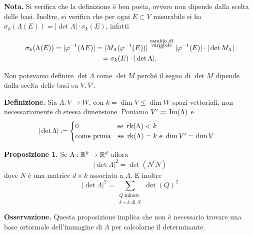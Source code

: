 \textbf{Nota.} Si verifica che la definizione è ben posta, ovvero non dipende dalla scelta delle basi. Inoltre, si verifica che per ogni $E \subset V$ misurabile si ha $\sigma_k(\Lambda(E)) = |\det \Lambda| \cdot \sigma_k(E)$, infatti
\begin{minipage}{0.2\textwidth}
%
%
\end{minipage}
%
\begin{minipage}{0.7\textwidth}
\begin{multline*}
	\sigma_k(\Lambda(E)) = | \varphi^{-1}(\Lambda E) |
	= | M_\Lambda (\varphi^{-1}(E)) |
	\overset{\substack{\text{cambio di} \\ \text{variabile}}}{=} | \varphi^{-1}(E) | \cdot | \det M_\Lambda | \\
	= \sigma_k(E) \cdot |\det \Lambda |.
\end{multline*}
\end{minipage}

Non potevamo definire $\det \Lambda$ come $\det M$ perché il segno di $\det M$ dipende dalla scelta delle basi su $V,V'$.

\vss

\textbf{Definizione.} Sia $\Lambda \colon V \to W$, con $k = \dim V \leq \dim W$ spazi vettoriali, non necessariamente di stessa dimensione. Poniamo $V' \coloneqq \operatorname{Im}(\Lambda)$ e 
%
$$
|\det \Lambda| \coloneqq 
\begin{cases}
	0 \qquad \qquad \quad \;\; \text{se } \operatorname{rk} (\Lambda) < k \\
	\text{come prima} \quad \text{se } \operatorname{rk}(\Lambda) = k \text{ e } \operatorname{dim} V' = \operatorname{dim} V
\end{cases} 
$$

\textbf{Proposizione 1.} Se $\Lambda : \mathbb R^k \to \mathbb R^d$ allora
%
\begin{equation}
	\tag{1}
	|\det \Lambda |^2 = \det (N^t N)
\end{equation}
%
dove $N$ è una matrice $d \times k$ associata a $\Lambda$.
E inoltre
%
\begin{equation}
	\tag{2}
	|\det \Lambda |^2 = \sum_{\substack{Q \text{ minore} \\ k \times k \text { di } N}} \det(Q)^2
\end{equation}
%

\textbf{Osservazione.} Questa proposizione implica che non è necessario trovare una base ortormale dell'immagine di $\Lambda$ per calcolarne il determinante.

